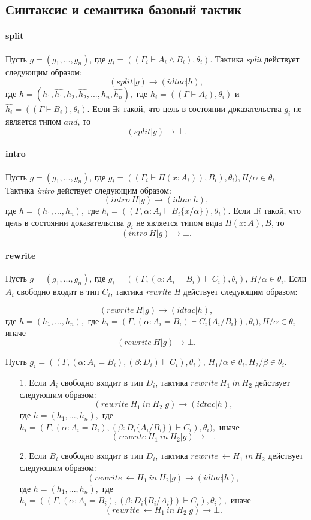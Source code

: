 \documentclass[12pt]{article}
\begin{document}
\subsection{Синтаксис и семантика базовый тактик}
\paragraph{split}
Пусть $g = (g_1, ..., g_n)$, где $g_i = ((\Gamma_i \vdash A_i \wedge B_i), \theta_i)$.
Тактика \textit{split} действует следующим образом:
$$(split|g) \xrightarrow{} (idtac| h),$$
где $h=(h_1,\hat{h_1},h_2,\hat{h_2},...,h_n,\hat{h_n}),$ где $h_i= ((\Gamma \vdash A_i), \theta_i)$ и $\hat{h_i}= ((\Gamma \vdash B_i), \theta_i).$
Если $\exists i$ такой, что цель в состоянии доказательства $g_i$ не является типом $and$, то
$$(split|g) \xrightarrow{} \bot.$$

\paragraph{intro}
Пусть $g = (g_1, ..., g_n)$, где $g_i = ((\Gamma_i \vdash \Pi (x:A_i)), B_i), \theta_i), H/\alpha \in \theta_i$.
Тактика \textit{intro} действует следующим образом:
$$(intro\ H|g) \xrightarrow{} (idtac| h),$$
где $h=(h_1,...,h_n),$ где $h_i= ((\Gamma, \alpha:A_i \vdash B_i\{x/\alpha\}), \theta_i).$
Если $\exists i$ такой, что цель в состоянии доказательства $g_i$ не является типом вида $\Pi (x:A), B$, то
$$(intro\ H|g) \xrightarrow{} \bot.$$

\paragraph{rewrite}
Пусть $g = (g_1, ..., g_n)$, где $g_i = ((\Gamma, (\alpha: A_i = B_i) \vdash C_i), \theta_i)$, $H/\alpha \in \theta_i$.
Если $A_i$ свободно входит в тип $C_i$, тактика \textit{rewrite H} действует следующим образом:

$$(rewrite\ H|g) \xrightarrow{} (idtac| h),$$
где $h=(h_1,...,h_n),$ где $h_i= (\Gamma, (\alpha: A_i = B_i) \vdash C_i\{A_i/B_i\}), \theta_i), H/\alpha \in \theta_i$ иначе
$$(rewrite\ H|g) \xrightarrow{} \bot.$$

Пусть $g_i = ((\Gamma, (\alpha: A_i = B_i),(\beta: D_i) \vdash C_i), \theta_i)$, $H_1/\alpha \in \theta_i, H_2/\beta \in \theta_i$.
\begin{enumerate}
    \item[1.] Если $A_i$ свободно входит в тип $D_i$, тактика $rewrite\ H_1\ in\ H_2$ действует следующим образом:
    $$(rewrite\ H_1\ in\ H_2|g) \xrightarrow{} (idtac| h),$$
где $h=(h_1,...,h_n),$ где $h_i= (\Gamma, (\alpha: A_i = B_i), (\beta: D_i\{A_i/B_i\}) \vdash C_i), \theta_i),$ иначе
    $$(rewrite\ H_1\ in\ H_2|g) \xrightarrow{} \bot.$$
    \item[2.] Если $B_i$ свободно входит в тип $D_i$, тактика $rewrite\ \xleftarrow{} H_1\ in\ H_2$ действует следующим образом:
    $$(rewrite\ \xleftarrow{} H_1\ in\ H_2|g) \xrightarrow{} (idtac| h),$$
    где $h=(h_1,...,h_n),$ где $h_i= ((\Gamma, (\alpha: A_i = B_i), (\beta: D_i\{B_i/A_i\}) \vdash C_i), \theta_i),$  
    иначе
    $$(rewrite\ \xleftarrow{} H_1\ in\ H_2|g) \xrightarrow{} \bot.$$
\end{enumerate}
\end{document}
